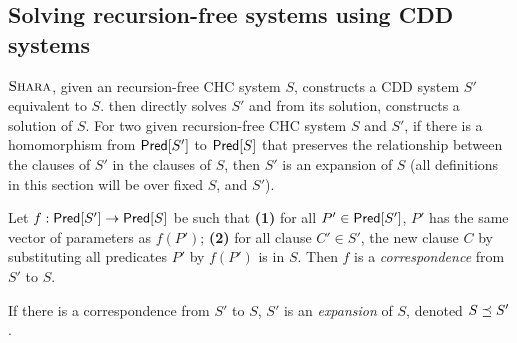 \subsection{Solving recursion-free systems using CDD systems}
\label{sec:core-solver}

$\textsc{Shara}$, given an recursion-free CHC system $S$,
constructs a CDD system $S'$ equivalent to $S$.
%
\sys then directly solves $S'$ and from its solution,
constructs a solution of $S$.
For two given recursion-free CHC system $S$ and $S'$, if
there is a homomorphism from $\mathsf{Pred}[ S' ]$ to $\mathsf{Pred}[ S ]$ that
preserves the relationship between the clauses of $S'$ in
the clauses of $S$, then $S'$ is an expansion of
$S$ (all definitions in this section will be over fixed
$S$, and $S'$).
\begin{defn}
  \label{defn:expansion}
  Let $f : \mathsf{Pred}[ S' ] \to \mathsf{Pred}[ S ]$ be such that
  \textbf{(1)} for all $P' \in \mathsf{Pred}[ S' ]$, $P'$ has the
  same vector of parameters as $f(P')$;
  \textbf{(2)} for all clause $C' \in S'$, the new clause $C$
  by substituting all predicates $P'$ by $f(P')$ is in $S$.
  Then $f$ is a \emph{correspondence} from $S'$ to $S$.
\end{defn}
%
If there is a correspondence from $S'$ to $S$,
$S'$ is an \emph{expansion} of $S$, denoted
$S \preceq S'$.
%

